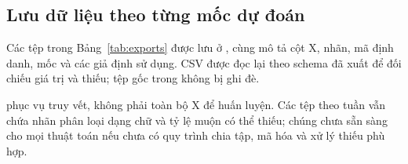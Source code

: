 \subsection{Lưu dữ liệu theo từng mốc dự đoán}
Các tệp trong Bảng~\ref{tab:exports} được lưu ở , cùng  mô tả cột X, nhãn, mã định danh, mốc và các giả định sử dụng. CSV được đọc lại theo schema đã xuất để đối chiếu giá trị và thiếu; tệp gốc trong  không bị ghi đè.
\begin{table}[tbp]
\centering
\caption{Các bộ dữ liệu đầu ra đã được lưu.}
\label{tab:exports}

\end{table}
 phục vụ truy vết, không phải toàn bộ X để huấn luyện. Các tệp theo tuần vẫn chứa nhãn phân loại dạng chữ và tỷ lệ muộn có thể thiếu; chúng chưa sẵn sàng cho mọi thuật toán nếu chưa có quy trình chia tập, mã hóa và xử lý thiếu phù hợp.
\FloatBarrier
